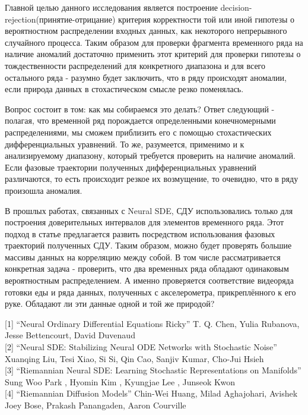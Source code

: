 \documentclass{article}
\begin{document}
   \par Главной целью данного исследования является построение decision-rejection(принятие-отрицание) критерия корректности той или иной гипотезы о вероятностном распределении входных данных, как некоторого непрерывного случайного процесса. Таким образом для проверки фрагмента временного ряда на наличие аномалий достаточно применить этот критерий для проверки гипотезы о тождественности распределений для конкретного диапазона и для всего остального ряда - разумно будет заключить, что в ряду происходят аномалии, если природа данных в стохастическом смысле резко поменялась.
   \par Вопрос состоит в том: как мы собираемся это делать? Ответ следующий - полагая, что временной ряд порождается определенными конечномерными распределениями, мы сможем приблизить его с помощью стохастических дифференциальных уравнений. То же, разумеется, применимо и к анализируемому диапазону, который требуется проверить на наличие аномалий. Если фазовые траектории полученных дифференциальных уравнений различаются, то есть происходит резкое их возмущение, то очевидно, что в ряду произошла аномалия.
   \par В прошлых работах, связанных с Neural SDE, СДУ использовались только для построения доверительных интервалов для элементов временного ряда. Этот подход в статье предлагается развить посредством использования фазовых траекторий полученных СДУ. Таким образом, можно будет проверять большие массивы данных на корреляцию между собой. В том числе рассматривается конкретная задача - проверить, что два временных ряда обладают одинаковым вероятностным распределением. А именно проверяется соответствие видеоряда готовки еды и ряда данных, полученных с акселерометра, прикреплённого к его руке. Обладают ли эти данные одной и той же природой?




[1] “Neural Ordinary Differential Equations Ricky” T. Q. Chen, Yulia Rubanova, Jesse Bettencourt, David Duvenaud \\

[2] “Neural SDE: Stabilizing Neural ODE Networks with Stochastic Noise” Xuanqing Liu, Tesi Xiao, Si Si, Qin Cao, Sanjiv Kumar, Cho-Jui Hsieh  \\

[3] “Riemannian Neural SDE: Learning Stochastic Representations on Manifolds” Sung Woo Park , Hyomin Kim , Kyungjae Lee , Junseok Kwon \\

[4] “Riemannian Diffusion Models” Chin-Wei Huang, Milad Aghajohari, Avishek Joey Bose, Prakash Panangaden, Aaron Courville \\
\end{document}
